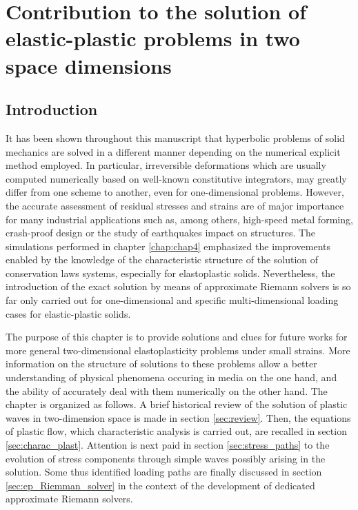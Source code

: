 \chapter{Contribution to the solution of elastic-plastic problems in two space dimensions}

\section*{Introduction}
It has been shown throughout this manuscript that hyperbolic problems of solid mechanics are solved in a different manner depending on the numerical explicit method employed. 
In particular, irreversible deformations which are usually computed numerically based on well-known constitutive integrators, may greatly differ from one scheme to another, even for one-dimensional problems.
However, the accurate assessment of residual stresses and strains are of major importance for many industrial applications such as, among others, high-speed metal forming, crash-proof design or the study of earthquakes impact on structures.
The simulations performed in chapter \ref{chap:chap4} emphasized the improvements enabled by the knowledge of the characteristic structure of the solution of conservation laws systems, especially for elastoplastic solids.
Nevertheless, the introduction of the exact solution by means of approximate Riemann solvers is so far only carried out for one-dimensional and specific multi-dimensional loading cases for elastic-plastic solids.

The purpose of this chapter is to provide solutions and clues for future works for more general two-dimensional elastoplasticity problems under small strains. 
More information on the structure of solutions to these problems allow a better understanding of physical phenomena occuring in media on the one hand, and the ability of accurately deal with them numerically on the other hand.
The chapter is organized as follows.
A brief historical review of the solution of plastic waves in two-dimension space is made in section \ref{sec:review}.
Then, the equations of plastic flow, which characteristic analysis is carried out, are recalled in section \ref{sec:charac_plast}.
Attention is next paid in section \ref{sec:stress_paths} to the evolution of stress components through simple waves possibly arising in the solution. 
Some thus identified loading paths are finally discussed in section \ref{sec:ep_Riemman_solver} in the context of the development of dedicated approximate Riemann solvers. 

